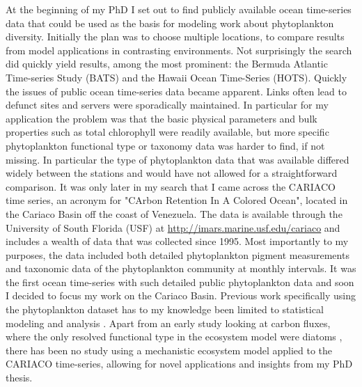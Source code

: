 At the beginning of my PhD I set out to find publicly available ocean time-series data that could be used as the basis for modeling work about phytoplankton diversity. Initially the plan was to choose multiple locations, to compare results from model applications in contrasting environments. Not surprisingly the search did quickly yield results, among the most prominent: the Bermuda Atlantic Time-series Study (BATS) and the Hawaii Ocean Time-Series (HOTS). Quickly the issues of public ocean time-series data became apparent. Links often lead to defunct sites and servers were sporadically maintained. In particular for my application the problem was that the basic physical parameters and bulk properties such as total chlorophyll were readily available, but more specific phytoplankton functional type or taxonomy data was harder to find, if not missing. In particular the type of phytoplankton data that was available differed widely between the stations and would have not allowed for a straightforward comparison. It was only later in my search that I came across the CARIACO time series, 
an acronym for "CArbon Retention In A Colored Ocean", located in the Cariaco Basin off the coast of Venezuela. The data is available through the University of South Florida (USF) at \href{http://imars.marine.usf.edu/cariaco}{http://imars.marine.usf.edu/cariaco} and includes a wealth of data that was collected since 1995. Most importantly to my purposes, the data included both detailed phytoplankton pigment measurements and taxonomic data of the phytoplankton community at monthly intervals. It was the first ocean time-series with such detailed public phytoplankton data and soon I decided to focus my work on the Cariaco Basin. Previous work specifically using the phytoplankton dataset has to my knowledge been limited to statistical modeling and analysis \citep{Taylor2012,Mutshinda2013a, Mutshinda2013,Pinckney2015,Irwin2015}. Apart from an early study looking at carbon fluxes, where the only resolved functional type in the ecosystem model were diatoms \citep{Walsh2002a}, there has been no study using a mechanistic ecosystem model applied to the CARIACO time-series, allowing for novel applications and insights from my PhD thesis.

